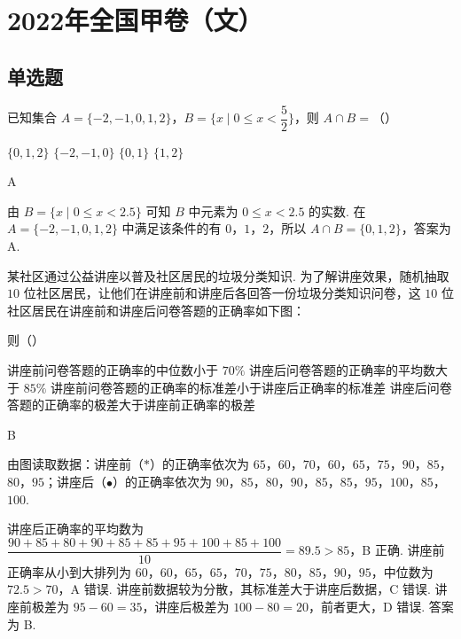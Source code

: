\chapter{2022年全国甲卷（文）}

\section{单选题}

\begin{problem}
已知集合 \(A=\{-2,-1,0,1,2\}\)，\(B=\{x\mid 0\le x<\dfrac{5}{2}\}\)，则 \(A\cap B=\)（\quad）

\choices
    {\(\{0,1,2\}\)}
    {\(\{-2,-1,0\}\)}
    {\(\{0,1\}\)}
    {\(\{1,2\}\)}
\end{problem}

\begin{answer}
A
\end{answer}

\begin{solution}
由 \(B=\{x\mid 0\le x<2.5\}\) 可知 \(B\) 中元素为 \(0\le x<2.5\) 的实数. 在 \(A=\{-2,-1,0,1,2\}\) 中满足该条件的有 \(0\)，\(1\)，\(2\)，所以 \(A\cap B=\{0,1,2\}\)，答案为 A.
\end{solution}

\begin{problem}
某社区通过公益讲座以普及社区居民的垃圾分类知识. 为了解讲座效果，随机抽取 \(10\) 位社区居民，让他们在讲座前和讲座后各回答一份垃圾分类知识问卷，这 \(10\) 位社区居民在讲座前和讲座后问卷答题的正确率如下图：


则（\quad）

\choices
    {讲座前问卷答题的正确率的中位数小于 \(70\%\)}
    {讲座后问卷答题的正确率的平均数大于 \(85\%\)}
    {讲座前问卷答题的正确率的标准差小于讲座后正确率的标准差}
    {讲座后问卷答题的正确率的极差大于讲座前正确率的极差}
\end{problem}

\begin{answer}
B
\end{answer}

\begin{solution}
由图读取数据：讲座前（\(*\)）的正确率依次为 \(65\)，\(60\)，\(70\)，\(60\)，\(65\)，\(75\)，\(90\)，\(85\)，\(80\)，\(95\)；讲座后（\(\bullet\)）的正确率依次为 \(90\)，\(85\)，\(80\)，\(90\)，\(85\)，\(85\)，\(95\)，\(100\)，\(85\)，\(100\).

讲座后正确率的平均数为 \(\dfrac{90+85+80+90+85+85+95+100+85+100}{10}=89.5>85\)，B 正确. 讲座前正确率从小到大排列为 \(60\)，\(60\)，\(65\)，\(65\)，\(70\)，\(75\)，\(80\)，\(85\)，\(90\)，\(95\)，中位数为 \(72.5>70\)，A 错误. 讲座前数据较为分散，其标准差大于讲座后数据，C 错误. 讲座前极差为 \(95-60=35\)，讲座后极差为 \(100-80=20\)，前者更大，D 错误. 答案为 B.
\end{solution}

